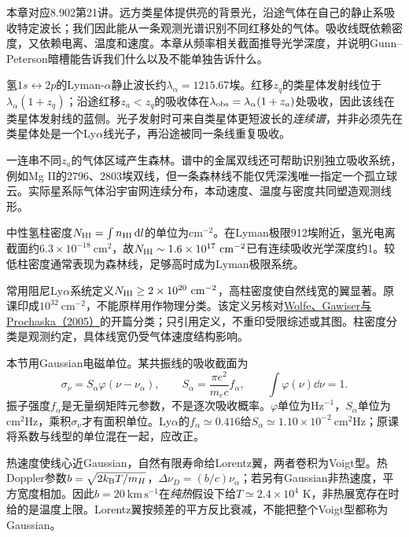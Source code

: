 本章对应8.902第21讲。远方类星体提供亮的背景光，沿途气体在自己的静止系吸收特定波长；我们因此能从一条观测光谱识别不同红移处的气体。吸收线既依赖密度，又依赖电离、温度和速度。本章从频率相关截面推导光学深度，并说明Gunn--Peterson暗槽能告诉我们什么以及不能单独告诉什么。

氢$1s\leftrightarrow2p$的Lyman-$\alpha$静止波长约$\lambda_\alpha=1215.67$埃。红移$z_q$的类星体发射线位于$\lambda_\alpha(1+z_q)$；沿途红移$z_a<z_q$的吸收体在$\lambda_{ \rm obs}=\lambda_\alpha(1+z_a)$处吸收，因此该线在类星体发射线的蓝侧。光子发射时可来自类星体更短波长的\emph{连续谱}，并非必须先在类星体处是一个Ly$\alpha$线光子，再沿途被同一条线重复吸收。

一连串不同$z_a$的气体区域产生森林。谱中的金属双线还可帮助识别独立吸收系统，例如Mg II的2796、2803埃双线，但一条森林线不能仅凭深浅唯一指定一个孤立球云。实际星系际气体沿宇宙网连续分布，本动速度、温度与密度共同塑造观测线形。

中性氢柱密度$N_{\rm HI}=\int n_{\rm HI}\,\mathrm d l$的单位为$\mathrm{cm}^{-2}$。在Lyman极限912埃附近，氢光电离截面约$6.3\times10^{-18}\ \mathrm{cm}^2$，故$N_{\rm HI}\sim1.6\times10^{17}\ \mathrm{cm}^{-2}$已有连续吸收光学深度约1。较低柱密度通常表现为森林线，足够高时成为Lyman极限系统。

常用阻尼Ly$\alpha$系统定义$N_{\rm HI}\ge2\times10^{20}\ \mathrm{cm}^{-2}$，高柱密度使自然线宽的翼显著。原课印成$10^{32}\ \mathrm{cm}^{-2}$，不能原样用作物理分类。该定义另核对\href{https://arxiv.org/abs/astro-ph/0509481}{Wolfe、Gawiser与Prochaska（2005）}的开篇分类；只引用定义，不重印受限综述或其图。柱密度分类是观测约定，具体线宽仍受气体速度结构影响。

本节用Gaussian电磁单位。某共振线的吸收截面为
\[
 \sigma_\nu=S_\alpha\varphi(\nu-\nu_\alpha),\qquad
 S_\alpha=\frac{\pi e^2}{m_ec}f_\alpha,\qquad\int\varphi(\nu)\dd\nu=1.
\]
振子强度$f_\alpha$是无量纲矩阵元参数，不是逐次吸收概率。$\varphi$单位为$\mathrm{Hz}^{-1}$，$S_\alpha$单位为$\mathrm{cm}^2\mathrm{Hz}$，乘积$\sigma_\nu$才有面积单位。Ly$\alpha$的$f_\alpha\simeq0.416$给$S_\alpha\simeq1.10\times10^{-2}\ \mathrm{cm}^2\mathrm{Hz}$；原课将系数与线型的单位混在一起，应改正。

热速度使线心近Gaussian，自然有限寿命给Lorentz翼，两者卷积为Voigt型。热Doppler参数$b=\sqrt{2k_{\mathrm B} T/m_H}$，$\Delta\nu_D=(b/c)\nu_\alpha$；若另有Gaussian非热速度，平方宽度相加。因此$b=20\ \mathrm{km\,s^{-1}}$在\emph{纯热}假设下给$T\simeq2.4\times10^4$ K，非热展宽存在时给的是温度上限。Lorentz翼按频差的平方反比衰减，不能把整个Voigt型都称为Gaussian。

